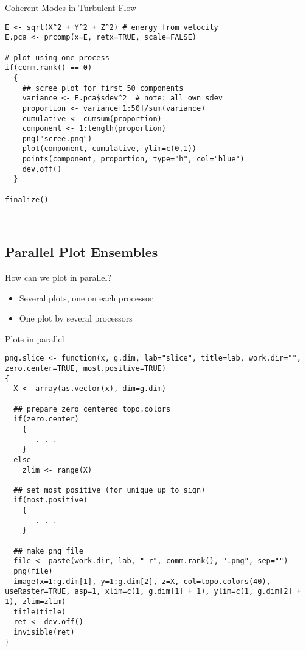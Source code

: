 \begin{frame}
  \begin{exampleblock}{Coherent Modes in Turbulent Flow}\pause
\begin{lstlisting}[title=Compute PCA and do Scree Plot (0\_pca.r)]
E <- sqrt(X^2 + Y^2 + Z^2) # energy from velocity
E.pca <- prcomp(x=E, retx=TRUE, scale=FALSE) 

# plot using one process
if(comm.rank() == 0)
  {
    ## scree plot for first 50 components
    variance <- E.pca$sdev^2  # note: all own sdev
    proportion <- variance[1:50]/sum(variance)
    cumulative <- cumsum(proportion)
    component <- 1:length(proportion)
    png("scree.png")
    plot(component, cumulative, ylim=c(0,1))
    points(component, proportion, type="h", col="blue")
    dev.off()
  }

finalize()
        
        

\end{lstlisting} %
  \end{exampleblock}
\end{frame}


\subsection{Parallel Plot Ensembles}

\begin{frame}
  \begin{block}{How can we plot in parallel?}\pause
  \begin{itemize}
    \item Several plots, one on each processor
    \item One plot by several processors
  \end{itemize}
  \end{block}
\end{frame}

\begin{frame}
  \begin{exampleblock}{Plots in parallel}\pause
\begin{lstlisting}[title=png.slice]
png.slice <- function(x, g.dim, lab="slice", title=lab, work.dir="", zero.center=TRUE, most.positive=TRUE)
{
  X <- array(as.vector(x), dim=g.dim)

  ## prepare zero centered topo.colors
  if(zero.center)
    {
       . . .
    }
  else
    zlim <- range(X)

  ## set most positive (for unique up to sign)
  if(most.positive)
    {
       . . .
    }
  
  ## make png file
  file <- paste(work.dir, lab, "-r", comm.rank(), ".png", sep="")
  png(file)
  image(x=1:g.dim[1], y=1:g.dim[2], z=X, col=topo.colors(40), useRaster=TRUE, asp=1, xlim=c(1, g.dim[1] + 1), ylim=c(1, g.dim[2] + 1), zlim=zlim)
  title(title)
  ret <- dev.off()
  invisible(ret)
}
\end{lstlisting}
  \end{exampleblock}
\end{frame}


